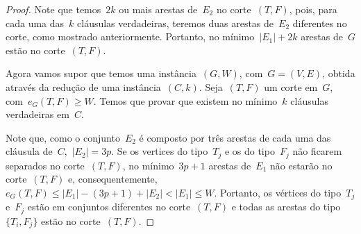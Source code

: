 \begin{proof}
		Note que temos~$2k$ ou mais arestas de~$E_2$ no
		corte~$(T,F)$, pois, para cada uma das~$k$ cláusulas
		verdadeiras, teremos duas arestas de~$E_2$ diferentes no corte, 
		como mostrado anteriormente.
		Portanto, no mínimo~$|E_1| + 2k$ arestas de~$G$ estão no corte~$(T,F)$.




		\bigskip
		\bigskip

		
		Agora vamos supor que temos uma instância~$(G,W)$,
		com~$G=(V,E)$, obtida através da redução de uma instância~$(C,k)$.
		Seja~$(T,F)$ um corte em~$G$,
		com~$e_G(T,F)\ge W$.
		Temos que provar que
		existem no mínimo~$k$ cláusulas verdadeiras em~$C$.

		Note que, como o conjunto~$E_2$ é composto por três arestas
		de cada uma das cláusula de~$C$,~${|E_2| = 3}p$.  
		Se os vertices do tipo~$T_j$ e os do tipo~$F_j$ não
		ficarem separados no corte~$(T,F)$,
		no mínimo~${3p+1}$ arestas de~$E_1$ não estarão
		no corte~$(T,F)$ e, 
		consequentemente,~${e_G(T,F)\le |E_1|-(3p+1)+|E_2|< |E_1| \le W}$. 
		Portanto, os vértices do tipo~$T_j$ e~$F_j$
		estão em conjuntos diferentes no corte~$(T,F)$
		e todas as arestas do tipo~$\{T_i,F_j\}$ estão no
		corte~$(T,F)$.


\end{proof}
